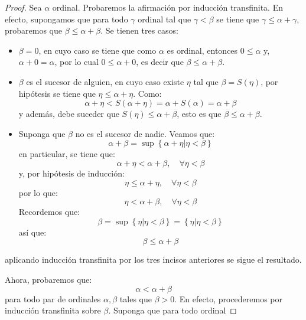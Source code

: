 \documentclass[12pt]{report}
\newcounter{it}
\theoremstyle{largebreak}
\begin{document}
    \begin{proof}
        Sea $\alpha$ ordinal. Probaremos la afirmación por inducción transfinita. En efecto, supongamos que para todo $\gamma$ ordinal tal que $\gamma<\beta$ se tiene que $\gamma\leq\alpha+\gamma$, probaremos que $\beta\leq\alpha+\beta$. Se tienen tres casos:
        \begin{itemize}
            \item $\beta=0$, en cuyo caso se tiene que como $\alpha$ es ordinal, entonces $0\leq\alpha$ y, $\alpha+0=\alpha$, por lo cual $0\leq\alpha+0$, es decir que $\beta\leq\alpha+\beta$.
            \item $\beta$ es el sucesor de alguien, en cuyo caso existe $\eta$ tal que $\beta=S(\eta)$, por hipótesis se tiene que $\eta\leq\alpha+\eta$. Como:
            \begin{equation*}
                \alpha+\eta<S(\alpha+\eta)=\alpha+S(\alpha)=\alpha+\beta
            \end{equation*}
            y además, debe suceder que $S(\eta)\leq\alpha+\beta$, esto es que $\beta\leq\alpha+\beta$.
            \item Suponga que $\beta$ no es el sucesor de nadie. Veamos que:
            \begin{equation*}
                \alpha+\beta=\sup\left\{\alpha+\eta\Big|\eta<\beta \right\}
            \end{equation*}
            en particular, se tiene que:
            \begin{equation*}
                \alpha+\eta<\alpha+\beta,\quad\forall\eta<\beta
            \end{equation*}
            y, por hipótesis de inducción:
            \begin{equation*}
                \eta\leq\alpha+\eta,\quad\forall\eta<\beta
            \end{equation*}
            por lo que:
            \begin{equation*}
                \eta<\alpha+\beta,\quad\forall\eta<\beta
            \end{equation*}
            Recordemos que:
            \begin{equation*}
                \beta=\sup\left\{\eta\Big|\eta<\beta \right\}=\left\{\eta\Big|\eta<\beta \right\}
            \end{equation*}
            así que:
            \begin{equation*}
                \beta\leq\alpha+\beta
            \end{equation*}
        \end{itemize} 
        aplicando inducción transfinita por los tres incisos anteriores se sigue el resultado.

        Ahora, probaremos que:
        \begin{equation*}
            \alpha<\alpha+\beta
        \end{equation*}
        para todo par de ordinales $\alpha,\beta$ tales que $\beta>0$. En efecto, procederemos por inducción transfinita sobre $\beta$. Suponga que para todo ordinal 
    \end{proof}
\end{document}
